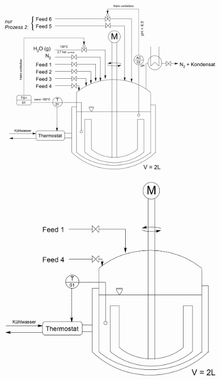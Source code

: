 \begin{figure}
	\centering
	\begin{minipage}{.5\textwidth}
		\centering
		\includegraphics[width=0.8\linewidth]{img/Skizze_Prozess_gesamt.png}
		\label{fig:prozess 1}
	\end{minipage}%
	\hfill
	\begin{minipage}{.45\textwidth}
		\centering
		\includegraphics[width=0.75\linewidth]{img/Skizze_Prozess_1_vereinfacht.png}
		\label{fig:prozess 1_vereinfacht}
	\end{minipage}
\end{figure}